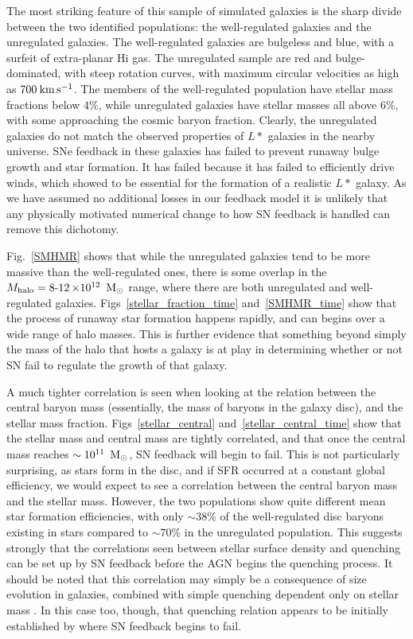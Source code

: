 The most striking feature of this sample of simulated galaxies is the sharp
divide between the two identified populations: the well-regulated galaxies and
the unregulated galaxies.  The well-regulated galaxies are bulgeless and blue,
with a surfeit of extra-planar {\sc Hi} gas.  The unregulated sample are red and
bulge-dominated, with steep rotation curves, with maximum circular velocities as
high as $700\>{\rm km}\,{\rm s}^{-1}$.  The members of the well-regulated population have stellar
mass fractions below $4\%$, while unregulated galaxies have stellar masses all
above $6\%$, with some approaching the cosmic baryon fraction.  Clearly, the
unregulated galaxies do not match the observed properties of $L*$ galaxies in
the nearby universe.  SNe feedback in these galaxies has failed to
prevent runaway bulge growth and star formation.  It has failed because it has
failed to efficiently drive winds, which \citet{Keller2015} showed to be
essential for the formation of a realistic $L*$ galaxy.    As we have assumed no
additional losses in our feedback model it is unlikely that any physically
motivated numerical change to how SN feedback is handled can remove this
dichotomy.

Fig.~\ref{SMHMR} shows that while the unregulated galaxies tend to be more
massive than the well-regulated ones, there is some overlap in the $M_{\rm
halo}=\operatorname{8-12}\times10^{12}\;\>{\rm M_{\odot}}$ range, where there are both
unregulated and well-regulated galaxies.  Figs~\ref{stellar_fraction_time}
and~\ref{SMHMR_time} show that the process of runaway star formation happens
rapidly, and can begins over a wide range of halo masses.  This is further
evidence that something beyond simply the mass of the halo that hosts a galaxy
is at play in determining whether or not SN fail to regulate the growth of that
galaxy.

A much tighter correlation is seen when looking at the relation between the
central baryon mass (essentially, the mass of baryons in the galaxy disc), and
the stellar mass fraction.  Figs~\ref{stellar_central}
and~\ref{stellar_central_time} show that the stellar mass and central mass are
tightly correlated, and that once the central mass reaches $\sim10^{11}\;\>{\rm M_{\odot}}$,
SN feedback will begin to fail.  This is not particularly surprising, as stars
form in the disc, and if SFR occurred at a constant global efficiency, we would
expect to see a correlation between the central baryon mass and the stellar
mass.  However, the two populations show quite different mean star formation
efficiencies, with only $\sim38\%$ of the well-regulated disc baryons existing
in stars compared to $\sim70\%$ in the unregulated population.  This suggests
strongly that the correlations seen between stellar surface density and
quenching \citep{Fang2013} can be set up by SN 
feedback before the AGN begins the quenching process.  It should be noted that
this correlation may simply be a consequence of size evolution
in galaxies, combined with simple quenching dependent only on stellar mass
\citep{Peng2010,Lilly2016}.  In this case too, though, that quenching relation
appears to be initially established by where SN feedback begins to fail.

